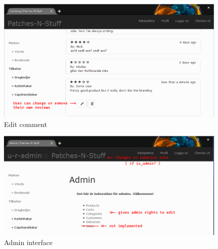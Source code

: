 \documentclass[paper=a4, fontsize=11pt]{report} %
\begin{document}
\begin{figure}
	\includegraphics[width=0.9\paperwidth]{artifacts/stories/14_comment_added.png}
	\caption{Edit comment}
	\label{fig:comment_added}
\end{figure}

\begin{figure}
	\includegraphics[width=0.9\paperwidth]{artifacts/stories/admin.png}
	\caption{Admin interface}
	\label{fig:admin}
\end{figure}
\end{document}
